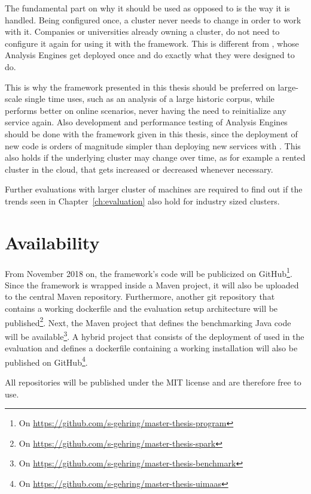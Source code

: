 The fundamental part on why it should be used as opposed to \uimaas{} is the way it is handled. Being configured once, a \spark{} cluster never needs to change in order to work with it. Companies or universities already owning a \spark{} cluster, do not need to configure it again for using it with the framework. This is different from \uimaas{}, whose Analysis Engines get deployed once and do exactly what they were designed to do. 

This is why the framework presented in this thesis should be preferred on large-scale single time uses, such as an analysis of a large historic corpus, while \uimaas{} performs better on online scenarios, never having the need to reinitialize any service again. Also development and performance testing of Analysis Engines should be done with the framework given in this thesis, since the deployment of new code is orders of magnitude simpler than deploying new services with \uimaas{}. This also holds if the underlying cluster may change over time, as for example a rented cluster in the cloud, that gets increased or decreased whenever necessary.

Further evaluations with larger cluster of machines are required to find out if the trends seen in Chapter~\ref{ch:evaluation} also hold for industry sized \spark{} clusters. 
\section{Availability}
\label{sec:availability}
From November 2018 on, the framework's code will be publicized on GitHub\footnote{On \url{https://github.com/s-gehring/master-thesis-program}}. Since the framework is wrapped inside a Maven project, it will also be uploaded to the central Maven repository. Furthermore, another git repository that contains a working \spark{} dockerfile and the evaluation setup architecture will be published\footnote{On \url{https://github.com/s-gehring/master-thesis-spark}}. Next, the Maven project that defines the benchmarking Java code will be available\footnote{On \url{https://github.com/s-gehring/master-thesis-benchmark}}. A hybrid project that consists of the deployment of \uimaas{} used in the evaluation and defines a dockerfile containing a working \uimaas{} installation will also be published on GitHub\footnote{On \url{https://github.com/s-gehring/master-thesis-uimaas}}. 

All repositories will be published under the MIT license and are therefore free to use.

